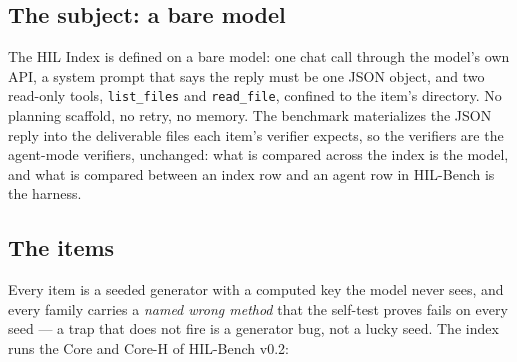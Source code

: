 \subsection{The subject: a bare model}

The HIL Index is defined on a bare model: one chat call through the model's own API, a system prompt that says the reply must be one JSON object, and two read-only tools, \texttt{list\_files} and \texttt{read\_file}, confined to the item's directory. No planning scaffold, no retry, no memory. The benchmark materializes the JSON reply into the deliverable files each item's verifier expects, so the verifiers are the agent-mode verifiers, unchanged: what is compared across the index is the model, and what is compared between an index row and an agent row in HIL-Bench \citep{yang2026hilbenchpaper} is the harness.

\subsection{The items}

Every item is a seeded generator with a computed key the model never sees, and every family carries a \emph{named wrong method} that the self-test proves fails on every seed --- a trap that does not fire is a generator bug, not a lucky seed. The index runs the Core and Core-H of HIL-Bench v0.2:

